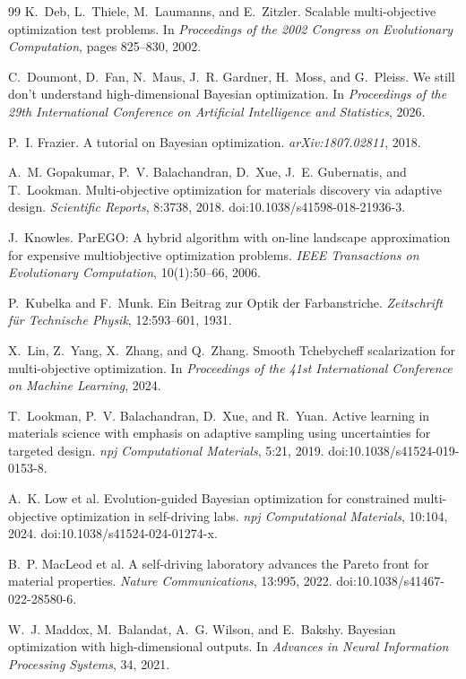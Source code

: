 \documentclass{article}
\begin{document}
\begin{thebibliography}{99}
K.~Deb, L.~Thiele, M.~Laumanns, and E.~Zitzler.
Scalable multi-objective optimization test problems.
In \emph{Proceedings of the 2002 Congress on Evolutionary Computation},
pages 825--830, 2002.

C.~Doumont, D.~Fan, N.~Maus, J.~R. Gardner, H.~Moss, and G.~Pleiss.
We still don't understand high-dimensional Bayesian optimization.
In \emph{Proceedings of the 29th International Conference on Artificial
Intelligence and Statistics}, 2026.

P.~I. Frazier.
A tutorial on Bayesian optimization.
\emph{arXiv:1807.02811}, 2018.

A.~M. Gopakumar, P.~V. Balachandran, D.~Xue, J.~E. Gubernatis, and T.~Lookman.
Multi-objective optimization for materials discovery via adaptive design.
\emph{Scientific Reports}, 8:3738, 2018.
doi:10.1038/s41598-018-21936-3.

J.~Knowles.
ParEGO: A hybrid algorithm with on-line landscape approximation for expensive
multiobjective optimization problems.
\emph{IEEE Transactions on Evolutionary Computation}, 10(1):50--66, 2006.

P.~Kubelka and F.~Munk.
Ein Beitrag zur Optik der Farbanstriche.
\emph{Zeitschrift f\"ur Technische Physik}, 12:593--601, 1931.

X.~Lin, Z.~Yang, X.~Zhang, and Q.~Zhang.
Smooth Tchebycheff scalarization for multi-objective optimization.
In \emph{Proceedings of the 41st International Conference on Machine Learning},
2024.

T.~Lookman, P.~V. Balachandran, D.~Xue, and R.~Yuan.
Active learning in materials science with emphasis on adaptive sampling using
uncertainties for targeted design.
\emph{npj Computational Materials}, 5:21, 2019.
doi:10.1038/s41524-019-0153-8.

A.~K. Low et al.
Evolution-guided Bayesian optimization for constrained multi-objective
optimization in self-driving labs.
\emph{npj Computational Materials}, 10:104, 2024.
doi:10.1038/s41524-024-01274-x.

B.~P. MacLeod et al.
A self-driving laboratory advances the Pareto front for material properties.
\emph{Nature Communications}, 13:995, 2022.
doi:10.1038/s41467-022-28580-6.

W.~J. Maddox, M.~Balandat, A.~G. Wilson, and E.~Bakshy.
Bayesian optimization with high-dimensional outputs.
In \emph{Advances in Neural Information Processing Systems}, 34, 2021.


\end{thebibliography}
\end{document}
